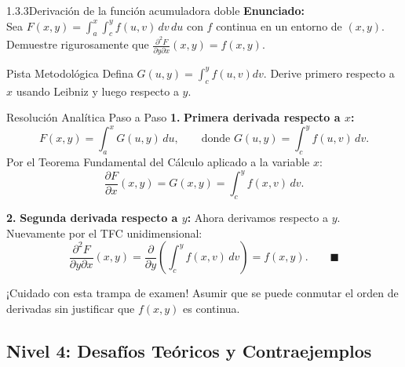 \documentclass[11pt,a4paper]{article}
\begin{document}
\begin{nivelbox}{1.3.3}{Derivación de la función acumuladora doble}
\textbf{Enunciado:}\\
Sea $F(x,y) = \int_a^x \int_c^y f(u,v) \, dv \, du$ con $f$ continua en un entorno de $(x,y)$. Demuestre rigurosamente que $\frac{\partial^2 F}{\partial y \partial x}(x,y) = f(x,y)$.

\begin{observacionbox}{Pista Metodológica}
Defina $G(u, y) = \int_c^y f(u,v) dv$. Derive primero respecto a $x$ usando Leibniz y luego respecto a $y$.
\end{observacionbox}

\begin{ejerciciobox}{Resolución Analítica Paso a Paso}
\smallskip\noindent\textbf{1.} \textbf{Primera derivada respecto a $x$:}
\[F(x,y) = \int_a^x G(u, y) \, du, \qquad \text{donde } G(u,y) = \int_c^y f(u,v) \, dv.\]
Por el Teorema Fundamental del Cálculo aplicado a la variable $x$:
\[\frac{\partial F}{\partial x}(x,y) = G(x, y) = \int_c^y f(x, v) \, dv.\]

\smallskip\noindent\textbf{2.} \textbf{Segunda derivada respecto a $y$:}
Ahora derivamos respecto a $y$. Nuevamente por el TFC unidimensional:
\[\frac{\partial^2 F}{\partial y \partial x}(x,y) = \frac{\partial}{\partial y} \left( \int_c^y f(x, v) \, dv \right) = f(x, y). \qquad \blacksquare\]
\end{ejerciciobox}

\begin{errorbox}{¡Cuidado con esta trampa de examen!}
Asumir que se puede conmutar el orden de derivadas sin justificar que $f(x,y)$ es continua.
\end{errorbox}
\end{nivelbox}
\bigskip

\subsection{Nivel 4: Desafíos Teóricos y Contraejemplos}
\end{document}
